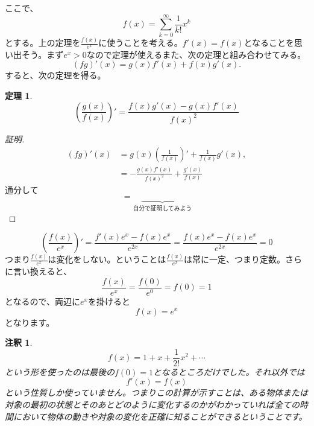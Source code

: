 \documentclass{ltjsarticle}
\newtheorem{theorem}{定理}[section]
\newtheorem{remark}{注釈}[section]
\begin{document}
ここで、
\begin{equation*}
f(x) = \sum_{k=0}^\infty {\frac 1 {k!}}x^k
\end{equation*}
とする。上の定理を${\frac {f(x)} {e^x}}$に使うことを考える。$f'(x) = f(x)$となることを思い出そう。まず$e^x>0$なので定理が使えるまた、次の定理と組み合わせてみる。
\begin{equation*}
(fg)'(x) = g(x)f'(x)+f(x)g'(x).
\end{equation*}
すると、次の定理を得る。
\begin{theorem}
\begin{equation*}
\left({\frac {g(x)}{f(x)}}\right)' = {\frac {f(x)g'(x)-g(x)f'(x)} {f(x)^2}}
\end{equation*}
\end{theorem}

\begin{proof}[証明]
\begin{align*}
(fg)'(x)& = g(x)\left({\frac 1 {f(x)}}\right)'+{\frac 1 {f(x)}}g'(x),\\
& = -{\frac {g(x)f'(x)} {f(x)^2}}+{\frac {g'(x)} {f(x)}}
\end{align*}
通分して
\begin{equation*}
=\underbrace{\quad\quad\quad\quad\quad}_{\text{自分で証明してみよう}}
\end{equation*}
\end{proof}

\begin{equation*}
\left({\frac {f(x)} {e^x}}\right)' = {\frac {f'(x)e^x-f(x)e^x } {e^{2x}}}= {\frac {f(x)e^x-f(x)e^x} {e^{2x}}}=0
\end{equation*}
つまり${\frac {f(x)} {e^x}}$は変化をしない。ということは${\frac {f(x)} {e^x}}$は常に一定、つまり定数。さらに言い換えると、
\begin{equation*}
{\frac {f(x)} {e^x}} = {\frac {f(0)} {e^0}} = f(0) = 1
\end{equation*}
となるので、両辺に$e^x$を掛けると
\begin{equation*}
f(x) = e^x
\end{equation*}
となります。
\begin{remark}
\begin{equation*}
f(x) = 1+x+{\frac 1 {2!}}x^2 +\cdots
\end{equation*}
という形を使ったのは最後の$f(0) = 1$となるところだけでした。それ以外では
\begin{equation*}
f'(x) = f(x)
\end{equation*}
という性質しか使っていません。つまりこの計算が示すことは、ある物体または対象の最初の状態とそのあとどのように変化するのかがわかっていれば全ての時間において物体の動きや対象の変化を正確に知ることができるということです。
\end{remark}
\end{document}
